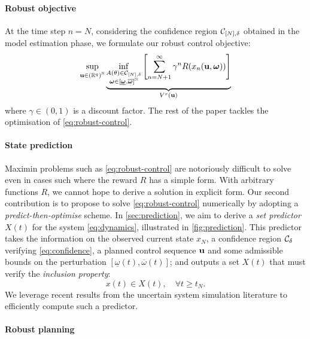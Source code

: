 \documentclass{article}
\begin{document}
\paragraph{Robust objective}

At the time step $n=N$, considering the confidence region $\mathcal{C}_{[N],\delta}$ obtained in the model estimation phase, we formulate our robust control objective:
\begin{equation}
\label{eq:robust-control}
\sup_{\mathbf{u}\in{(\mathbb{R}^q)}^{\mathbb{N}}} \underbrace{\inf_{\substack{A(\theta) \in \mathcal{C}_{[N],\delta} \\ \bm{\omega}\in[\underline{\bm{\omega}},\overline{\bm{\omega}}]^{\mathbb{N}}}} \left[\sum_{n=N+1}^\infty \gamma^n R(x_n(\mathbf{u},\bm{\omega}))\right]}_{V^r(\mathbf{u})}
\end{equation}
where $\gamma\in(0,1)$ is a discount factor. The rest of the paper tackles the optimisation of \eqref{eq:robust-control}.

\paragraph{State prediction}

Maximin problems such as \eqref{eq:robust-control} are notoriously difficult to solve even in cases such where the reward $R$ has a simple form. With arbitrary functions $R$, we cannot hope to derive a solution in explicit form. Our second contribution is to propose to solve \eqref{eq:robust-control} numerically by adopting a \emph{predict-then-optimise} scheme. In \autoref{sec:prediction}, we aim to derive a \emph{set predictor} $X(t)$ for the system \eqref{eq:dynamics}, illustrated in \autoref{fig:prediction}. This predictor takes the information on the observed current state ${x}_N$, a confidence region $\mathcal{C}_\delta$ verifying \eqref{eq:confidence}, a planned control sequence $\mathbf{u}$ and some admissible bounds on the perturbation $[\underline{\omega}(t),\overline{\omega}(t)]$; and outputs a set $X(t)$ that must verify the \emph{inclusion property}:
\begin{equation}
\label{eq:inclusion-generic}
 x(t)\in X(t),\quad\forall t\geq t_N.
\end{equation}
We leverage recent results from the uncertain system simulation literature to efficiently compute such a predictor.

\paragraph{Robust planning}
\end{document}
